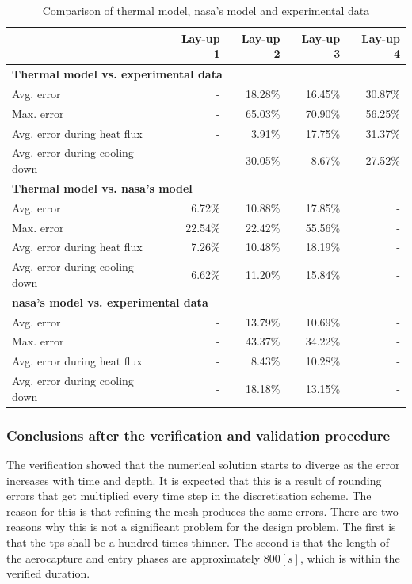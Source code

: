 \begin{table}[h]
	\centering
	\caption{Comparison of thermal model, \acrshort{nasa}'s model and experimental data}
	\begin{tabular}{|p{5.6cm}|rrrr|}
		\hline
		\textbf{} & \textbf{Lay-up 1} & \textbf{Lay-up 2} & \textbf{Lay-up 3} & \textbf{Lay-up 4} \\ \hline \hline
		\multicolumn{5}{|l|}{\textbf{Thermal model vs. experimental data}}			\\ \hline	
		Avg. error											&        - & 18.28\% & 16.45\% & 30.87\% \\
		Max. error											&        - & 65.03\% & 70.90\% & 56.25\% \\
		Avg. error during heat flux							&        - &  3.91\% & 17.75\% & 31.37\% \\
		Avg. error during cooling down						&        - & 30.05\% &  8.67\% & 27.52\% \\ \hline
		\multicolumn{5}{|l|}{\textbf{Thermal model vs. \gls{nasa}'s model}}			\\ \hline		
		Avg. error											&   6.72\% & 10.88\% & 17.85\% &        - \\
		Max. error											&  22.54\% & 22.42\% & 55.56\% &        - \\
		Avg. error during heat flux							&   7.26\% & 10.48\% & 18.19\% &        - \\
		Avg. error during cooling down						&   6.62\% & 11.20\% & 15.84\% &        - \\ \hline
		\multicolumn{5}{|l|}{\textbf{\gls{nasa}'s model vs. experimental data}}			\\ \hline		
		Avg. error											&        - & 13.79\% & 10.69\% &        - \\
		Max. error											&        - & 43.37\% & 34.22\% &        - \\
		Avg. error during heat flux							&        - &  8.43\% & 10.28\% &        - \\
		Avg. error during cooling down						&        - & 18.18\% & 13.15\% &        - \\ \hline
	\end{tabular}
	\label{tab:valerrorthermo}
\end{table}


\subsubsection{Conclusions after the verification and validation procedure}
The verification showed that the numerical solution starts to diverge as the error increases with time and depth. It is expected that this is a result of rounding errors that get multiplied every time step in the discretisation scheme. The reason for this is that refining the mesh produces the same errors. There are two reasons why this is not a significant problem for the design problem. The first is that the \gls{tps} shall be a hundred times thinner. The second is that the length of the aerocapture and entry phases are approximately $800 \left[s\right]$, which is within the verified duration. 
 
